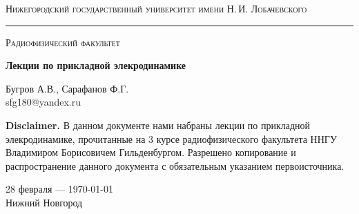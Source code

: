 \begin{titlepage}
\thispagestyle{empty}

\begin{center}
	{\small\textsc{Нижегородский государственный университет имени Н.\,И. Лобачевского}}
	\vskip 3pt \hrule \vskip 5pt
	{\small\textsc{Радиофизический факультет}}

	\vfill

	\begin{spacing}{2}
	{\Huge \bf  Лекции по прикладной элекродинамике}\\%
	\end{spacing}
	\vspace{1em}
	{\Large Бугров А.В., Сарафанов Ф.Г.}\\[2em]
	{\large sfg180@yandex.ru}\\
	\vspace{1em}
\end{center}

\textbf{Disclaimer.} В данном документе нами набраны лекции по прикладной элекродинамике, прочитанные на 3 курсе радиофизического факультета ННГУ Владимиром Борисовичем Гильденбургом. Разрешено копирование и распространение данного документа с обязательным указанием первоисточника. 

\begin{center}
	\vfill
	28 февраля --- \today\\Нижний Новгород
\end{center}

\end{titlepage}